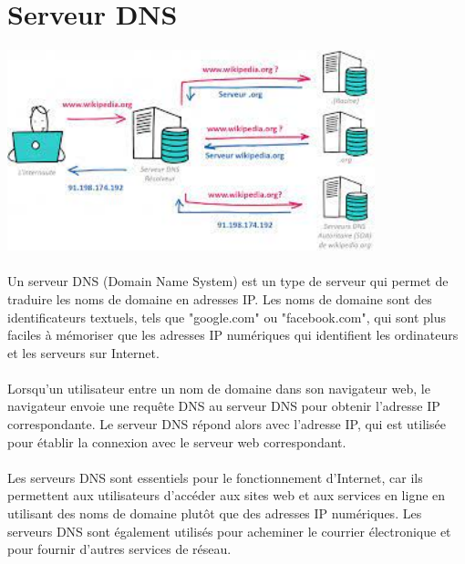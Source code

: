  \section{Serveur DNS}
\vspace{4mm}
\paragraph{
	\includegraphics[width=0.8\textwidth]{PhotoMemoire/serveur_dns.jpeg}}
\paragraph{ }
Un serveur DNS (Domain Name System) est un type de serveur qui permet de traduire les noms de domaine en adresses IP. Les noms de domaine sont des identificateurs textuels, tels que "google.com" ou "facebook.com", qui sont plus faciles à mémoriser que les adresses IP numériques qui identifient les ordinateurs et les serveurs sur Internet.
\paragraph{ }
Lorsqu'un utilisateur entre un nom de domaine dans son navigateur web, le navigateur envoie une requête DNS au serveur DNS pour obtenir l'adresse IP correspondante. Le serveur DNS répond alors avec l'adresse IP, qui est utilisée pour établir la connexion avec le serveur web correspondant.
\paragraph{ }
Les serveurs DNS sont essentiels pour le fonctionnement d'Internet, car ils permettent aux utilisateurs d'accéder aux sites web et aux services en ligne en utilisant des noms de domaine plutôt que des adresses IP numériques. Les serveurs DNS sont également utilisés pour acheminer le courrier électronique et pour fournir d'autres services de réseau.

